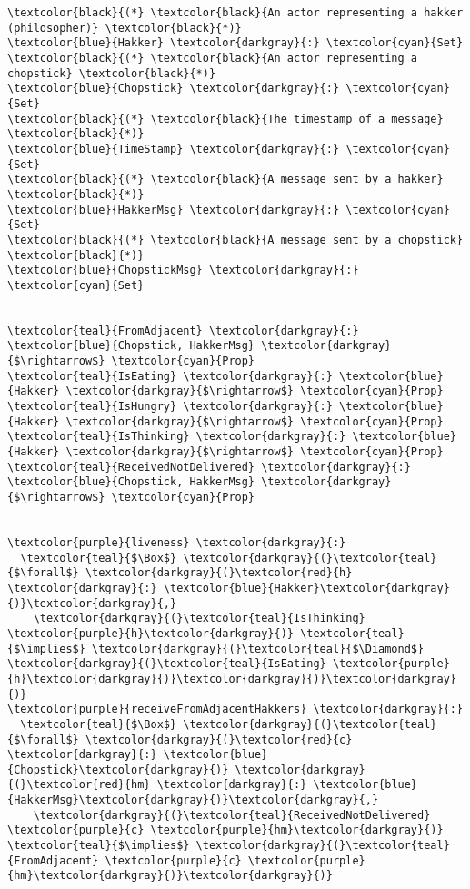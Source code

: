 \begin{Verbatim}[commandchars=\\\{\},codes={\catcode`$=3}]
\textcolor{black}{(*} \textcolor{black}{An actor representing a hakker (philosopher)} \textcolor{black}{*)}
\textcolor{blue}{Hakker} \textcolor{darkgray}{:} \textcolor{cyan}{Set}
\textcolor{black}{(*} \textcolor{black}{An actor representing a chopstick} \textcolor{black}{*)}
\textcolor{blue}{Chopstick} \textcolor{darkgray}{:} \textcolor{cyan}{Set}
\textcolor{black}{(*} \textcolor{black}{The timestamp of a message} \textcolor{black}{*)}
\textcolor{blue}{TimeStamp} \textcolor{darkgray}{:} \textcolor{cyan}{Set}
\textcolor{black}{(*} \textcolor{black}{A message sent by a hakker} \textcolor{black}{*)}
\textcolor{blue}{HakkerMsg} \textcolor{darkgray}{:} \textcolor{cyan}{Set}
\textcolor{black}{(*} \textcolor{black}{A message sent by a chopstick} \textcolor{black}{*)}
\textcolor{blue}{ChopstickMsg} \textcolor{darkgray}{:} \textcolor{cyan}{Set}


\textcolor{teal}{FromAdjacent} \textcolor{darkgray}{:} \textcolor{blue}{Chopstick, HakkerMsg} \textcolor{darkgray}{$\rightarrow$} \textcolor{cyan}{Prop}
\textcolor{teal}{IsEating} \textcolor{darkgray}{:} \textcolor{blue}{Hakker} \textcolor{darkgray}{$\rightarrow$} \textcolor{cyan}{Prop}
\textcolor{teal}{IsHungry} \textcolor{darkgray}{:} \textcolor{blue}{Hakker} \textcolor{darkgray}{$\rightarrow$} \textcolor{cyan}{Prop}
\textcolor{teal}{IsThinking} \textcolor{darkgray}{:} \textcolor{blue}{Hakker} \textcolor{darkgray}{$\rightarrow$} \textcolor{cyan}{Prop}
\textcolor{teal}{ReceivedNotDelivered} \textcolor{darkgray}{:} \textcolor{blue}{Chopstick, HakkerMsg} \textcolor{darkgray}{$\rightarrow$} \textcolor{cyan}{Prop}


\textcolor{purple}{liveness} \textcolor{darkgray}{:} 
  \textcolor{teal}{$\Box$} \textcolor{darkgray}{(}\textcolor{teal}{$\forall$} \textcolor{darkgray}{(}\textcolor{red}{h} \textcolor{darkgray}{:} \textcolor{blue}{Hakker}\textcolor{darkgray}{)}\textcolor{darkgray}{,} 
    \textcolor{darkgray}{(}\textcolor{teal}{IsThinking} \textcolor{purple}{h}\textcolor{darkgray}{)} \textcolor{teal}{$\implies$} \textcolor{darkgray}{(}\textcolor{teal}{$\Diamond$} \textcolor{darkgray}{(}\textcolor{teal}{IsEating} \textcolor{purple}{h}\textcolor{darkgray}{)}\textcolor{darkgray}{)}\textcolor{darkgray}{)}
\textcolor{purple}{receiveFromAdjacentHakkers} \textcolor{darkgray}{:} 
  \textcolor{teal}{$\Box$} \textcolor{darkgray}{(}\textcolor{teal}{$\forall$} \textcolor{darkgray}{(}\textcolor{red}{c} \textcolor{darkgray}{:} \textcolor{blue}{Chopstick}\textcolor{darkgray}{)} \textcolor{darkgray}{(}\textcolor{red}{hm} \textcolor{darkgray}{:} \textcolor{blue}{HakkerMsg}\textcolor{darkgray}{)}\textcolor{darkgray}{,} 
    \textcolor{darkgray}{(}\textcolor{teal}{ReceivedNotDelivered} \textcolor{purple}{c} \textcolor{purple}{hm}\textcolor{darkgray}{)} \textcolor{teal}{$\implies$} \textcolor{darkgray}{(}\textcolor{teal}{FromAdjacent} \textcolor{purple}{c} \textcolor{purple}{hm}\textcolor{darkgray}{)}\textcolor{darkgray}{)}
\end{Verbatim}
